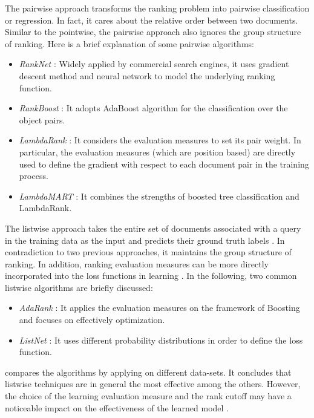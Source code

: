 The pairwise approach transforms the ranking problem into pairwise classification or regression. In fact, it cares about the relative order between two documents. Similar to the pointwise, the pairwise approach also ignores the group structure of ranking\cite{l2r-intro}. Here is a brief explanation of some pairwise algorithms:

\begin{itemize}
\item \textit{RankNet} \cite{l2r-ranknet}: Widely applied by commercial search engines, it uses gradient descent method and neural network to model the underlying ranking function.
\item \textit{RankBoost} \cite{l2r-rankboost}: It adopts AdaBoost algorithm for the classification over the object pairs.
\item \textit{LambdaRank} \cite{l2r-lambdarank}: It considers the evaluation measures to set its pair weight. In particular, the evaluation measures (which are position based) are directly used to define the gradient with respect to each document pair in the training process.
\item \textit{LambdaMART} \cite{l2r-lambdamart}: It combines the strengths of boosted tree classification and LambdaRank.
\end{itemize}

The listwise approach takes the entire set of documents associated with a query in the training data as the input and predicts their ground truth labels \cite{l2r-book}. In contradiction to two previous approaches, it maintains the group structure of ranking. In addition, ranking evaluation measures can be more directly incorporated into the loss functions in learning \cite{l2r-intro}. In the following, two common listwise algorithms are briefly discussed:

\begin{itemize}
\item \textit{AdaRank} \cite{l2r-adarank}: It applies the evaluation measures on the framework of Boosting and focuses on effectively optimization.
\item \textit{ListNet} \cite{l2r-listnet}: It uses different probability distributions in order to define the loss function.
\end{itemize}

\cite{l2r-book} compares the algorithms by applying on different data-sets. It concludes that listwise techniques are in general the most effective among the others. However, the choice of the learning evaluation measure and the rank cutoff may have a noticeable impact on the effectiveness of the learned model \cite{l2r-when}.

